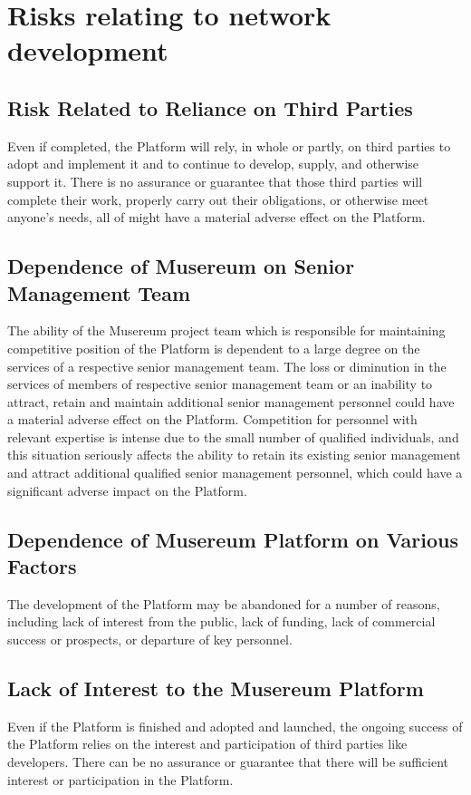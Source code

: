 \documentclass[12pt]{report}
\begin{document}
\section{Risks relating to network development}
\subsection{Risk Related to Reliance on Third Parties}
Even if completed, the Platform will rely, in whole or partly, on third parties to adopt and implement it and to continue to develop, supply, and otherwise support it. There is no assurance or guarantee that those third parties will complete their work, properly carry out their obligations, or otherwise meet anyone’s needs, all of might have a material adverse effect on the Platform.

\subsection{Dependence of Musereum on Senior Management Team}
The ability of the Musereum project team which is responsible for maintaining competitive position of the Platform is dependent to a large degree on the services of a respective senior management team. The loss or diminution in the services of members of respective senior management team or an inability to attract, retain and maintain additional senior management personnel could have a material adverse effect on the Platform. Competition for personnel with relevant expertise is intense due to the small number of qualified individuals, and this situation seriously affects the ability to retain its existing senior management and attract additional qualified senior management personnel, which could have a significant adverse impact on the Platform.

\subsection{Dependence of Musereum Platform on Various Factors}
The development of the Platform may be abandoned for a number of reasons, including lack of interest from the public, lack of funding, lack of commercial success or prospects, or departure of key personnel.

\subsection{Lack of Interest to the Musereum Platform}
Even if the Platform is finished and adopted and launched, the ongoing success of the Platform relies on the interest and participation of third parties like developers. There can be no assurance or guarantee that there will be sufficient interest or participation in the Platform.
\end{document}
